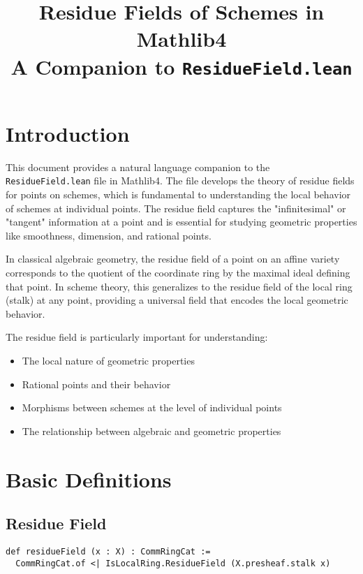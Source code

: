 \documentclass{article}
\title{Residue Fields of Schemes in Mathlib4\\
\large A Companion to \texttt{ResidueField.lean}}
\author{}
\date{}
\theoremstyle{definition}
\begin{document}
\maketitle

\section{Introduction}

This document provides a natural language companion to the \texttt{ResidueField.lean} file in Mathlib4. The file develops the theory of residue fields for points on schemes, which is fundamental to understanding the local behavior of schemes at individual points. The residue field captures the "infinitesimal" or "tangent" information at a point and is essential for studying geometric properties like smoothness, dimension, and rational points.

In classical algebraic geometry, the residue field of a point on an affine variety corresponds to the quotient of the coordinate ring by the maximal ideal defining that point. In scheme theory, this generalizes to the residue field of the local ring (stalk) at any point, providing a universal field that encodes the local geometric behavior.

The residue field is particularly important for understanding:
\begin{itemize}
\item The local nature of geometric properties
\item Rational points and their behavior
\item Morphisms between schemes at the level of individual points
\item The relationship between algebraic and geometric properties
\end{itemize}

\section{Basic Definitions}

\subsection{Residue Field}

\begin{lstlisting}
def residueField (x : X) : CommRingCat :=
  CommRingCat.of <| IsLocalRing.ResidueField (X.presheaf.stalk x)
\end{lstlisting}
\end{document}
